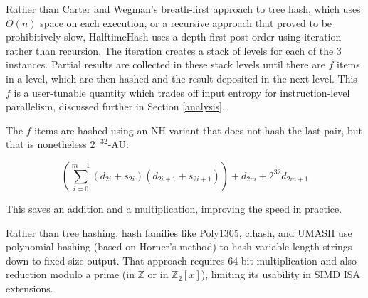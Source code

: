 \documentclass[runningheads]{llncs}
\newcommand{\ints}{\mathbb{Z}}
\begin{document}




Rather than Carter and Wegman's breath-first approach to tree hash, which uses $\Theta(n)$ space on each execution, or a recursive approach that proved to be prohibitively slow, HalftimeHash uses a depth-first post-order using iteration rather than recursion.
The iteration creates a stack of levels for each of the 3 instances.
Partial results are collected in these stack levels until there are $f$ items in a level, which are then hashed and the result deposited in the next level.
This $f$ is a user-tunable quantity which trades off input entropy for instruction-level parallelism, discussed further in Section \ref{analysis}.

The $f$ items are hashed using an NH variant that does not hash the last pair, but that is nonetheless $2^{-32}$-AU: \cite{badger}

\[
\left(\sum_{i=0}^{m-1} (d_{2i} + s_{2i})(d_{2i+1} + s_{2i+1})\right) + d_{2m} + 2^{32} d_{2m+1}
\]

This saves an addition and a multiplication, improving the speed in practice.

Rather than tree hashing, hash families like Poly1305, clhash, and UMASH use polynomial hashing (based on Horner's method) to hash variable-length strings down to fixed-size output.
That approach requires 64-bit multiplication and also reduction modulo a prime (in $\ints$ or in $\ints_2[x]$), limiting its usability in SIMD ISA extensions.
\end{document}
